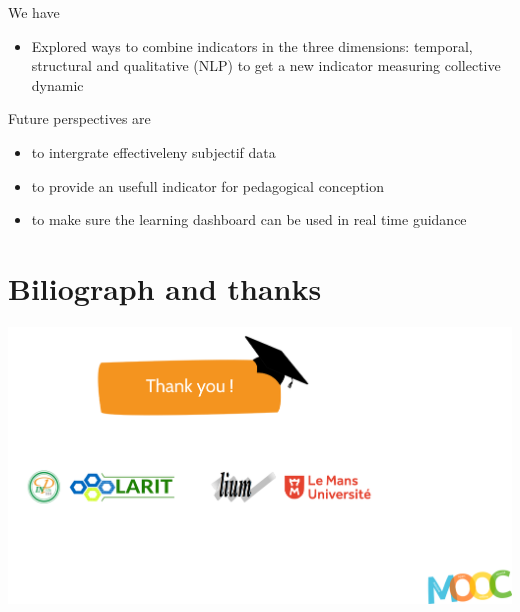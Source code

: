 \documentclass{beamer}
\begin{document}
\begin{frame}{We have}
  \begin{itemize}
  \item Explored ways to combine indicators in the three dimensions: temporal, structural and qualitative (NLP) to get a new indicator measuring collective dynamic
  \end{itemize}
  
  \begin{block}{Future perspectives are}
    \begin{itemize}
    \item to intergrate effectiveleny subjectif data
    \item to provide an usefull indicator for pedagogical conception
    \item to make sure the learning dashboard can be used in real time guidance
    \end{itemize}
  \end{block}
\end{frame}

\section{Biliograph and thanks}
\begin{frame}[allowframebreaks]
  \Large {}
  \includegraphics[width=\textwidth]{./Images/thanks}
\end{frame}
\end{document}
